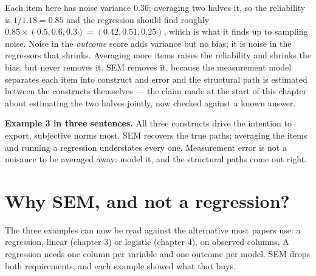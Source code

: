 \documentclass[
  letterpaper,
  10pt,
  twoside,
  openright,
  numbers=noenddot,
  chapterprefix=true]{scrbook}
\begin{document}
Each item here has noise variance \(0.36\); averaging two halves it, so
the reliability is \(1 / 1.18 = 0.85\) and the regression should find
roughly \(0.85 \times (0.5, 0.6, 0.3) = (0.42, 0.51, 0.25)\), which is
what it finds up to sampling noise. Noise in the \emph{outcome} score
adds variance but no bias; it is noise in the regressors that shrinks.
Averaging more items raises the reliability and shrinks the bias, but
never removes it. SEM removes it, because the measurement model
separates each item into construct and error and the structural path is
estimated between the constructs themselves --- the claim made at the
start of this chapter about estimating the two halves jointly, now
checked against a known answer.

\textbf{Example 3 in three sentences.} All three constructs drive the
intention to export, subjective norms most. SEM recovers the true paths;
averaging the items and running a regression understates every one.
Measurement error is not a nuisance to be averaged away: model it, and
the structural paths come out right.

\section{Why SEM, and not a
regression?}\label{why-sem-and-not-a-regression}

The three examples can now be read against the alternative most papers
use: a regression, linear (chapter 3) or logistic (chapter 4), on
observed columns. A regression needs one column per variable and one
outcome per model. SEM drops both requirements, and each example showed
what that buys.
\end{document}
